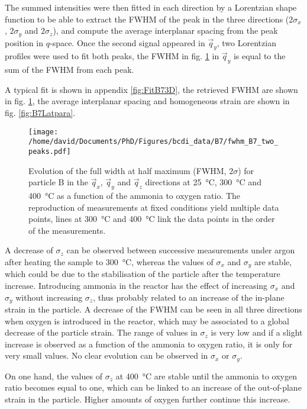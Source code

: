 The summed intensities were then fitted in each direction by a Lorentzian shape function to be able to extract the FWHM of the peak in the three directions ($2\sigma_x$, $2\sigma_y$ and $2\sigma_z$), and compute the average interplanar spacing from the peak position in $q$-space.
Once the second signal appeared in $\vec{q}_y$, two Lorentzian profiles were used to fit both peaks, the FWHM in fig. \ref{fig:B7FWHM} in $\vec{q}_y$ is equal to the sum of the FWHM from each peak.

A typical fit is shown in appendix \ref{fig:FitB73D}, the retrieved FWHM are shown in fig. \ref{fig:B7FWHM}, the average interplanar spacing and homogeneous strain are shown in fig. \ref{fig:B7Latpara}.

\begin{figure}[!htb]
    \centering
    \texttt{[image: /home/david/Documents/PhD/Figures/bcdi\_data/B7/fwhm\_B7\_two\_peaks.pdf]}
    \caption{
        Evolution of the full width at half maximum (FWHM, $2\sigma$) for particle B in the $\vec{q}_x$, $\vec{q}_y$ and $\vec{q}_z$ directions at \qty{25}{\degreeCelsius}, \qty{300}{\degreeCelsius} and \qty{400}{\degreeCelsius} as a function of the ammonia to oxygen ratio.
        The reproduction of measurements at fixed conditions yield multiple data points, lines at \qty{300}{\degreeCelsius} and \qty{400}{\degreeCelsius} link the data points in the order of the measurements.
    }
    \label{fig:B7FWHM}
\end{figure}

A decrease of $\sigma_z$ can be observed between successive measurements under argon after heating the sample to \qty{300}{\degreeCelsius}, whereas the values of $\sigma_x$ and $\sigma_y$ are stable, which could be due to the stabilisation of the particle after the temperature increase.
Introducing ammonia in the reactor has the effect of increasing $\sigma_x$ and $\sigma_y$ without increasing $\sigma_z$, thus probably related to an increase of the in-plane strain in the particle.
A decrease of the FWHM can be seen in all three directions when oxygen is introduced in the reactor, which may be associated to a global decrease of the particle strain.
The range of values in $\sigma_z$ is very low and if a slight increase is observed as a function of the ammonia to oxygen ratio, it is only for very small values.
No clear evolution can be observed in $\sigma_x$ or $\sigma_y$.

On one hand, the values of $\sigma_z$ at \qty{400}{\degreeCelsius} are stable until the ammonia to oxygen ratio becomes equal to one, which can be linked to an increase of the out-of-plane strain in the particle.
Higher amounts of oxygen further continue this increase.

